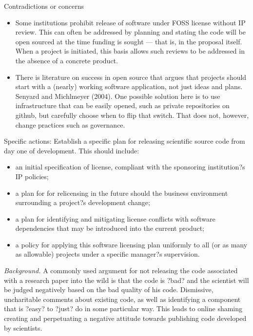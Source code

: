 \documentclass[a4paper,UKenglish]{dagman}
\begin{document}
Contradictions or concerns
\begin{itemize}
\item Some institutions prohibit release of software under FOSS license without IP review. This can often be addressed by planning and stating the code will be open sourced at the time funding is sought --- that is, in the proposal itself. When a project is initiated, this basis allows such reviews to be addressed in the absence of a concrete product.
\item There is literature on success in open source that argues that projects should start with a (nearly) working software application, not just ideas and plans. Senyard and Michlmeyer (2004). One possible solution here is to use infrastructure that can be easily opened, such as private repositories on github, but carefully choose when to flip that switch. That does not, however, change practices such as governance.
\end{itemize}

Specific actions:
Establish a specific plan for releasing scientific source code from day one of development. This should include:
\begin{itemize}
\item an initial specification of license, compliant with the sponsoring institution?s IP policies;
\item a plan for for relicensing in the future should the business environment surrounding a project?s development change;
\item a plan for identifying and mitigating license conflicts with software dependencies that may be introduced into the current product;
\item a policy for applying this software licensing plan uniformly to all (or as many as allowable) projects under a specific manager?s supervision. 
\end{itemize}





\emph{Background.} A commonly used argument for not releasing the code associated with a research paper into the wild is that the code is ?bad? and the scientist will be judged negatively based on the bad quality of his code. Dismissive, uncharitable comments about existing code, as well as identifying a component that is ?easy? to ?just? do in some particular way. This leads to online shaming creating and perpetuating a negative attitude towards publishing code developed by scientists.
\end{document}
